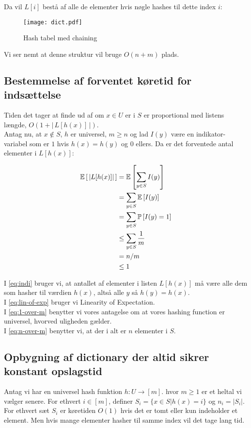 Da vil $L[i]$ bestå af alle de elementer hvis nøgle hashes til dette index $i$:
\begin{figure}[H]
  \begin{center}
  \texttt{[image: dict.pdf]}
  \end{center}
  \caption{Hash tabel med chaining}
  \label{fig:hash}
\end{figure}

Vi ser nemt at denne struktur vil bruge $O(n + m)$ plads.

\subsection{Bestemmelse af forventet køretid for indsættelse}

Tiden det tager at finde ud af om $x \in U$ er i $S$ er proportional med listens længde, $O(1 + | \, L[h(x)] \, |)$.\\

Antag nu, at $x \notin S$, $h$ er universel, $m \geq n$ og lad $I(y)$ være en indikator-variabel som er $1$ hvis $h(x) = h(y)$ og $0$ ellers. Da er det forventede antal elementer i $L[h(x)]$:

\begin{align}
  \mathbb{E} \left[   \, |L[h(x)]| \,   \right]
  &= \mathbb{E} \left[   \sum_{y \in S} I(y)  \right] \label{eq:indi} \\
  &= \sum_{y \in S} \mathbb{E} \left[  I(y)  \right] \label{eq:lin-of-exp} \\
  &= \sum_{y \in S} \mathbb{P} \left[  I(y) = 1  \right] \nonumber \\
  &\leq \sum_{y \in S} \frac{1}{m} \label{eq:1-over-m} \\
  &= n/m \label{eq:n-over-m} \\
  &\leq 1 \nonumber
\end{align}

I \cref{eq:indi} bruger vi, at antallet af elementer i listen $L[h(x)]$ må være alle dem som hasher til værdien $h(x)$, altså alle $y$ så $h(y) = h(x)$.\\
I \cref{eq:lin-of-exp} bruger vi Linearity of Expectation.\\
I \cref{eq:1-over-m} benytter vi vores antagelse om at vores hashing function er universel, hvorved uligheden gælder.\\
I \cref{eq:n-over-m} benytter vi, at der i alt er $n$ elementer i $S$.






\subsection{Opbygning af dictionary der altid sikrer konstant opslagstid}
Antag vi har en universel hash funktion $h : U \rightarrow [m]$. hvor $m \geq 1$ er et heltal vi vælger senere. For ethvert $i \in [m]$, definer $S_i = \{ x \in S | h(x) = i \}$ og $n_i = |S_i|$. For ethvert sæt $S_i$ er køretiden $O(1)$ hvis det er tomt eller kun indeholder et element. Men hvis mange elementer hasher til samme index vil det tage lang tid.\\

